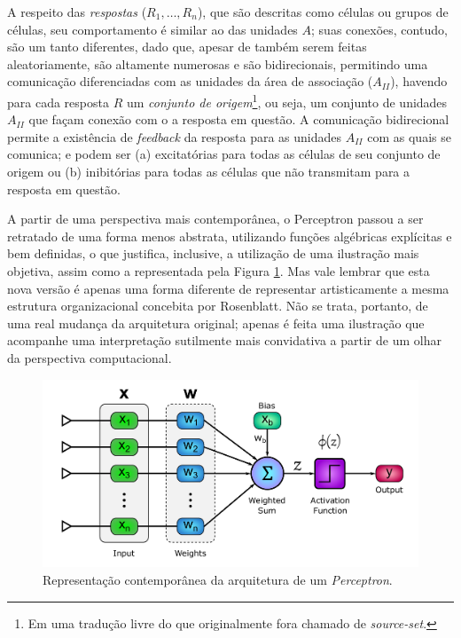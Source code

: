 A respeito das \textit{respostas} ($R_{1}, \dots, R_{n}$), que são descritas como células ou grupos de células, seu comportamento é similar ao das unidades $A$; suas conexões, contudo, são um tanto diferentes, dado que, apesar de também serem feitas aleatoriamente, são altamente numerosas e são bidirecionais, permitindo uma comunicação diferenciadas com as unidades da área de associação ($A_{II}$), havendo para cada resposta $R$ um \textit{conjunto de origem}\footnote{Em uma tradução livre do que originalmente fora chamado de \textit{source-set}.}, ou seja, um conjunto de unidades $A_{II}$ que façam conexão com o a resposta em questão. A comunicação bidirecional permite a existência de \textit{feedback} da resposta para as unidades $A_{II}$ com as quais se comunica; e podem ser (a) excitatórias para todas as células de seu conjunto de origem ou (b) inibitórias para todas as células que não transmitam para a resposta em questão.

A partir de uma perspectiva mais contemporânea, o Perceptron passou a ser retratado de uma forma menos abstrata, utilizando funções algébricas explícitas e bem definidas, o que justifica, inclusive, a utilização de uma ilustração mais objetiva, assim como a representada pela Figura \ref{fig:ann_perceptron_new_organization}. Mas vale lembrar que esta nova versão é apenas uma forma diferente de representar artisticamente a mesma estrutura organizacional concebita por Rosenblatt. Não se trata, portanto, de uma real mudança da arquitetura original; apenas é feita uma ilustração que acompanhe uma interpretação sutilmente mais convidativa a partir de um olhar da perspectiva computacional.

\begin{figure}[H]
    \centering
    \includegraphics[width=1.00\textwidth]{figs/ann_perceptron_new_organization.pdf}
    \caption{Representação contemporânea da arquitetura de um \textit{Perceptron}.}
    \label{fig:ann_perceptron_new_organization}
\end{figure}


